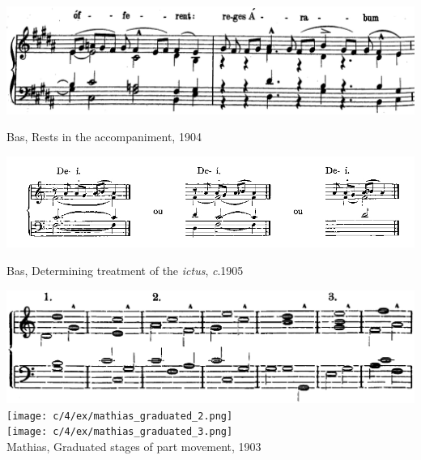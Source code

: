 \newpage

\vspace*{\fill}


\begin{example}
  \centering
  \includegraphics[width=.9\linewidth]{c/4/ex/bas_epiphany_4.JPG}
  \caption{Bas, Rests in the accompaniment, 1904}
  \label{mus:bas_epiphany_4}
\end{example}

\vspace*{\fill}

\begin{example}
  \centering
  \includegraphics[width=\linewidth]{c/4/ex/bas_paleo.jpg}
  \caption{Bas, Determining treatment of the \emph{ictus}, \emph{c}.1905}
  \label{mus:bas_paleo}
\end{example}

\vspace*{\fill}

\newpage

\vspace*{\fill}

\begin{example}
  \centering
  \includegraphics[width=.75\linewidth]{c/4/ex/mathias_graduated_1.png}\\
  \texttt{[image: c/4/ex/mathias\_graduated\_2.png]}\\
  \texttt{[image: c/4/ex/mathias\_graduated\_3.png]}\\
  \caption{Mathias, Graduated stages of part movement, 1903}
  \label{mus:mathias_graduated}
\end{example}

